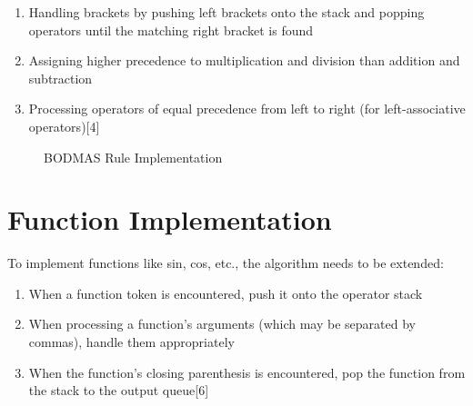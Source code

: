 \documentclass[a4paper,12pt]{article}
\begin{document}
\begin{enumerate}
    \item Handling brackets by pushing left brackets onto the stack and popping operators until the matching right bracket is found
    \item Assigning higher precedence to multiplication and division than addition and subtraction
    \item Processing operators of equal precedence from left to right (for left-associative operators)[4]
\end{enumerate}

\begin{figure}[h]
    \centering
    \caption{BODMAS Rule Implementation}
    \label{fig:bodmas}
\end{figure}

\section{Function Implementation}

To implement functions like sin, cos, etc., the algorithm needs to be extended:

\begin{enumerate}
    \item When a function token is encountered, push it onto the operator stack
    \item When processing a function's arguments (which may be separated by commas), handle them appropriately
    \item When the function's closing parenthesis is encountered, pop the function from the stack to the output queue[6]
\end{enumerate}
\end{document}
